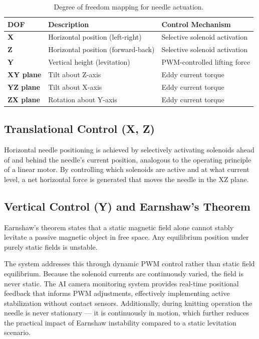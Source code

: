 \documentclass[12pt, a4paper]{article}
\begin{document}
\begin{table}[h]
\centering
\begin{tabular}{>{\bfseries}l l l}
\toprule
DOF & Description & Control Mechanism \\
\midrule
X & Horizontal position (left-right) & Selective solenoid activation \\
Z & Horizontal position (forward-back) & Selective solenoid activation \\
Y & Vertical height (levitation) & PWM-controlled lifting force \\
XY plane & Tilt about Z-axis & Eddy current torque \\
YZ plane & Tilt about X-axis & Eddy current torque \\
ZX plane & Rotation about Y-axis & Eddy current torque \\
\bottomrule
\end{tabular}
\caption{Degree of freedom mapping for needle actuation.}
\end{table}

\subsection{Translational Control (X, Z)}
Horizontal needle positioning is achieved by selectively activating
solenoids ahead of and behind the needle's current position, analogous
to the operating principle of a linear motor. By controlling which
solenoids are active and at what current level, a net horizontal force
is generated that moves the needle in the XZ plane.

\subsection{Vertical Control (Y) and Earnshaw's Theorem}
Earnshaw's theorem states that a static magnetic field alone cannot
stably levitate a passive magnetic object in free space. Any equilibrium
position under purely static fields is unstable.

The system addresses this through dynamic PWM control rather than static
field equilibrium. Because the solenoid currents are continuously varied,
the field is never static. The AI camera monitoring system provides
real-time positional feedback that informs PWM adjustments, effectively
implementing active stabilization without contact sensors. Additionally,
during knitting operation the needle is never stationary --- it is
continuously in motion, which further reduces the practical impact of
Earnshaw instability compared to a static levitation scenario.
\end{document}
